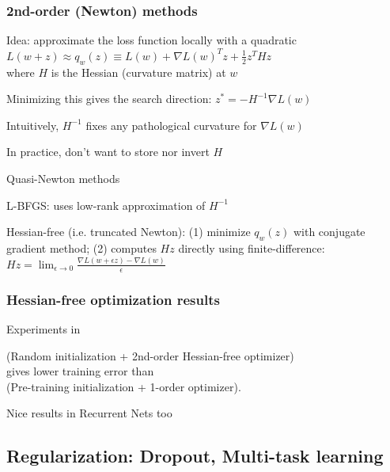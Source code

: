 \begin{frame}
\frametitle{2nd-order (Newton) methods}
\bi
\item Idea: approximate the loss function locally with a quadratic\\[0.2cm]
$L(w+z) \approx q_w(z) \equiv L(w) + \nabla L(w)^T z + \frac{1}{2} z^T H z $\\[0.2cm]
\hspace{1cm} where $H$ is the Hessian (curvature matrix) at $w$\\[0.2cm]
\pause
\item Minimizing this gives the search direction: $z^{*}=-H^{-1}\nabla L(w) $
        \bi
        \item Intuitively, $H^{-1}$ fixes any pathological curvature for $\nabla L(w)$
        \item In practice, don't want to store nor invert $H$
        \ei
\pause
\item Quasi-Newton methods
        \bi
        \item L-BFGS: uses low-rank approximation of $H^{-1}$
        \pause
        \item Hessian-free (i.e. truncated Newton): (1) minimize $q_w(z)$ with conjugate gradient method; (2) computes $Hz$ directly using finite-difference: $Hz = \lim_{\epsilon\rightarrow 0} \frac{\nabla L(w+\epsilon z) - \nabla L(w)}{\epsilon}$
        \ei
\ei
\end{frame}

\begin{frame}
\frametitle{Hessian-free optimization results}
\bi
\item Experiments in \cite{martens10hessianfree} \\[0.2cm]
\begin{center}
(Random initialization + 2nd-order Hessian-free optimizer) \\[0.2cm]
 gives lower training error than \\[0.2cm]
 (Pre-training initialization + 1-order optimizer).\\[0.5cm]
 \end{center}
 \item Nice results in Recurrent Nets too \cite{martens11recurrent}
\ei
\end{frame}

\subsection[Regularization]{Regularization: Dropout, Multi-task learning}


